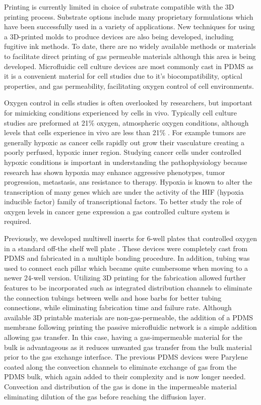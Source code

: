 \documentclass[10pt,letterpaper]{article}
\begin{document}
Printing is currently limited in choice of substrate compatible with the 3D printing process.
Substrate options include many proprietary formulations which have been successfully used in a variety of applications.
New techniques for using a 3D-printed molds to produce devices\cite{Mcdonald2002,Gregory2013,King2014,Comina2014a} are also being developed, including fugitive ink methods\cite{Therriault2003,Miller2012,Bhargava2015}.
To date, there are no widely available methods or materials to facilitate direct printing of gas permeable materials although this area is being developed\cite{Femmer2014a}.
Microfluidic cell culture devices are most commonly cast in PDMS as it is a convenient material for cell studies due to it's biocompatibility, optical properties, and gas permeability, facilitating oxygen control of cell environments\cite{Sia2003,Brennan2014}.

Oxygen control in cells studies is often overlooked by researchers, but important for mimicking conditions experienced by cells in vivo.
Typically cell culture studies are preformed at 21\% oxygen, atmospheric oxygen conditions, although levels that cells experience in vivo are less than 21\% \cite{Brennan2014}.
For example tumors are generally hypoxic as cancer cells rapidly out grow their vasculature creating a poorly perfused, hypoxic inner region\cite{Kumar2014}.
Studying cancer cells under controlled hypoxic conditions is important in understanding the pathophysiology because research has shown hypoxia may enhance aggressive phenotypes, tumor progression, metastasis, ans resistance to therapy.
Hypoxia is known to alter the transcription of many genes which are under the activity of the HIF (hypoxia inducible factor) family of transcriptional factors.
To better study the role of oxygen levels in cancer gene expression a gas controlled culture system is required.

Previously, we developed multiwell inserts for 6-well plates that controlled oxygen in a standard off-the shelf well plate \cite{Oppegard2009, Oppegard2010}.
These devices were completely cast from PDMS and fabricated in a multiple bonding procedure.
In addition, tubing was used to connect each pillar which became quite cumbersome when moving to a newer 24-well version.
Utilizing 3D printing for the fabrication allowed further features to be incorporated such as integrated distribution channels to eliminate the connection tubings between wells and hose barbs for better tubing connections, while eliminating fabrication time and failure rate.
Although available 3D printable materials are non-gas-permeable, the addition of a PDMS membrane following printing the passive microfluidic network is a simple addition allowing gas transfer. 
In this case, having a gas-impermeable material for the bulk is advantageous as it reduces unwanted gas transfer from the bulk material prior to the gas exchange interface.
The previous PDMS devices were Parylene coated along the convection channels to eliminate exchange of gas from the PDMS bulk, which again added to their complexity and is now longer needed.
Convection and distribution of the gas is done in the impermeable material eliminating dilution of the gas before reaching the diffusion layer. 
\end{document}
